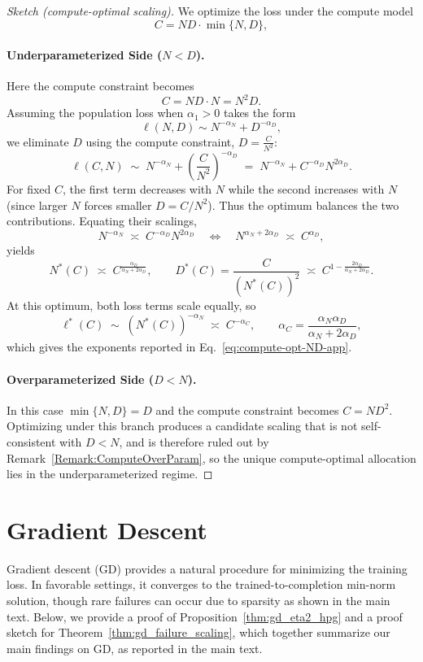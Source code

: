 \documentclass[11pt]{article}
\theoremstyle{plain}
\theoremstyle{definition}
\theoremstyle{remark}
\begin{document}
\begin{proof}[Sketch (compute-optimal scaling)]
We optimize the loss under the compute model
\[
C = ND\cdot \min\{N,D\},
\]

\paragraph{Underparameterized Side ($N<D$).}
Here the compute constraint becomes
\[
C = ND\cdot N = N^2D.
\]
Assuming the population loss when $\alpha_1>0$ takes the form
\[
\ell(N,D)\sim N^{-\alpha_N}+D^{-\alpha_D},
\]
we eliminate $D$ using the compute constraint, $D = \frac{C}{N^2}$:
\[
\ell(C,N)\;\sim\; N^{-\alpha_N}+\left(\frac{C}{N^2}\right)^{-\alpha_D}
\;=\; N^{-\alpha_N}+C^{-\alpha_D}N^{2\alpha_D}.
\]
For fixed $C$, the first term decreases with $N$ while the second increases
with $N$ (since larger $N$ forces smaller $D=C/N^2$). Thus the optimum balances
the two contributions. Equating their scalings,
\[
N^{-\alpha_N}\;\asymp\; C^{-\alpha_D}N^{2\alpha_D}
\quad\Longleftrightarrow\quad
N^{\alpha_N+2\alpha_D}\;\asymp\; C^{\alpha_D},
\]
yields
\[
N^*(C)\;\asymp\; C^{\frac{\alpha_D}{\alpha_N+2\alpha_D}},
\qquad
D^*(C)=\frac{C}{(N^*(C))^2}\;\asymp\; C^{1-\frac{2\alpha_D}{\alpha_N+2\alpha_D}}.
\]
At this optimum, both loss terms scale equally, so
\[
\ell^*(C)\;\sim\; (N^*(C))^{-\alpha_N}
\;\asymp\;
C^{-\alpha_C},
\qquad
\alpha_C=\frac{\alpha_N\alpha_D}{\alpha_N+2\alpha_D},
\]
which gives the exponents reported in Eq.~\eqref{eq:compute-opt-ND-app}.

\paragraph{Overparameterized Side ($D<N$).}
In this case $\min\{N,D\}=D$ and the compute constraint becomes $C=ND^2$.
Optimizing under this branch produces a candidate scaling that is not
self-consistent with $D<N$, and is therefore ruled out by Remark~\ref{Remark:ComputeOverParam}, so the unique compute-optimal allocation lies in the
underparameterized regime.

\end{proof}


\section{Gradient Descent}\label{appendix:GD}

Gradient descent (GD) provides a natural procedure for minimizing the training loss. In favorable settings, it converges to the trained-to-completion min-norm solution, though rare failures can occur due to sparsity as shown in the main text. Below, we provide a proof of Proposition~\ref{thm:gd_eta2_hpg} and a proof sketch for Theorem~\ref{thm:gd_failure_scaling}, which together summarize our main findings on GD, as reported in the main text.
\end{document}
